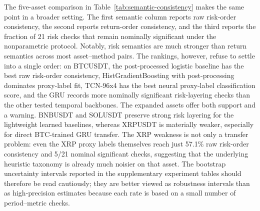 \documentclass[a4paper,fleqn]{cas-dc}
\begin{document}
The five-asset comparison in Table~\ref{tab:semantic-consistency} makes the same point in a broader setting. The first semantic column reports raw risk-order consistency, the second reports return-order consistency, and the third reports the fraction of 21 risk checks that remain nominally significant under the nonparametric protocol. Notably, risk semantics are much stronger than return semantics across most asset--method pairs. The rankings, however, refuse to settle into a single order: on BTCUSDT, the post-processed logistic baseline has the best raw risk-order consistency, HistGradientBoosting with post-processing dominates proxy-label fit, TCN-96x4 has the best neural proxy-label classification score, and the GRU records more nominally significant risk-layering checks than the other tested temporal backbones. The expanded assets offer both support and a warning. BNBUSDT and SOLUSDT preserve strong risk layering for the lightweight learned baselines, whereas XRPUSDT is materially weaker, especially for direct BTC-trained GRU transfer. The XRP weakness is not only a transfer problem: even the XRP proxy labels themselves reach just 57.1\% raw risk-order consistency and 5/21 nominal significant checks, suggesting that the underlying heuristic taxonomy is already much noisier on that asset. The bootstrap uncertainty intervals reported in the supplementary experiment tables should therefore be read cautiously; they are better viewed as robustness intervals than as high-precision estimates because each rate is based on a small number of period--metric checks.
\end{document}
